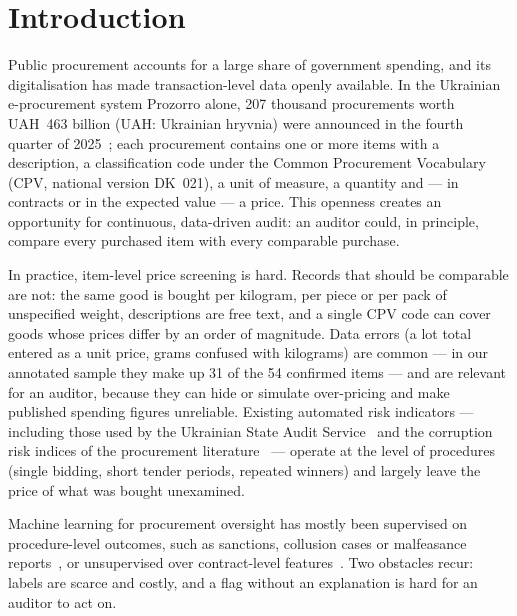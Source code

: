 \documentclass[conference]{IEEEtran}
\begin{document}
\section{Introduction}

Public procurement accounts for a large share of government spending, and its digitalisation has made
transaction-level data openly available. In the Ukrainian e-procurement system Prozorro alone,
207 thousand procurements worth UAH~463 billion (UAH: Ukrainian hryvnia) were announced in the fourth quarter of 2025~\cite{prozorro2026q4}; each
procurement contains one or more items with a description, a classification code under the Common
Procurement Vocabulary (CPV, national version DK~021), a unit of measure, a quantity and --- in contracts or
in the expected value --- a price. This openness creates an opportunity for continuous, data-driven audit:
an auditor could, in principle, compare every purchased item with every comparable purchase.

In practice, item-level price screening is hard. Records that should be comparable are not: the same good
is bought per kilogram, per piece or per pack of unspecified weight, descriptions are free text, and a
single CPV code can cover goods whose prices differ by an order of magnitude. Data errors (a lot total
entered as a unit price, grams confused with kilograms) are common --- in our annotated sample they make up
31 of the 54 confirmed items --- and are relevant for an auditor, because they can hide or simulate
over-pricing and make published spending figures unreliable. Existing
automated risk indicators --- including those used by the Ukrainian State Audit Service~\cite{minfin2024indicators}
and the corruption risk indices of the procurement literature~\cite{fazekas2016objective,gti2024indicators}
--- operate at the level of procedures (single bidding, short tender periods, repeated winners) and largely
leave the price of what was bought unexamined.

Machine learning for procurement oversight has mostly been supervised on procedure-level outcomes, such as
sanctions, collusion cases or malfeasance reports~\cite{gallego2021preventing,huber2019screens,tas2024collusion},
or unsupervised over contract-level features~\cite{niessen2020ocds,torresberru2021mining}. Two obstacles
recur: labels are scarce and costly, and a flag without an explanation is hard for an auditor to act on.
\end{document}
